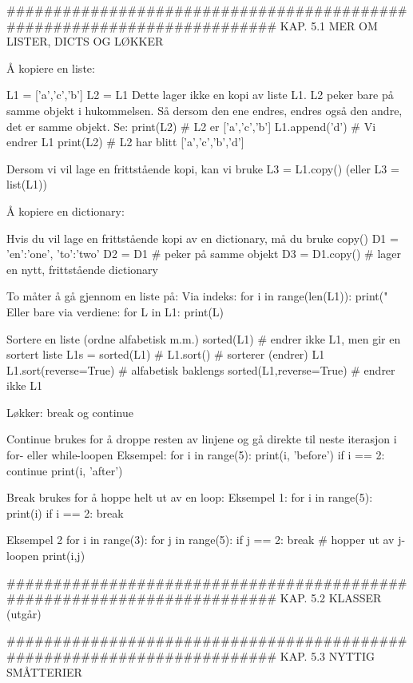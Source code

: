 \documentclass[a4paper,11pt,utf8]{book}
\begin{document}
######################################################################## 
KAP. 5.1  MER OM LISTER, DICTS OG LØKKER

Å kopiere en liste:

L1 = ['a','c','b']
L2 = L1
Dette lager ikke en kopi av liste L1.
L2 peker bare på samme objekt i hukommelsen.
Så dersom den ene endres, endres også den andre, det er samme objekt.
Se: 
print(L2)       # L2 er ['a','c','b']
L1.append('d')  # Vi endrer L1
print(L2)       # L2 har blitt ['a','c','b','d']

Dersom vi vil lage en frittstående kopi, kan vi bruke 
L3 = L1.copy()
(eller L3 = list(L1))



Å kopiere en dictionary: 

Hvis du vil lage en frittstående kopi av en dictionary, må du bruke copy()
D1 = {'en':'one', 'to':'two'}
D2 = D1           # peker på samme objekt
D3 = D1.copy()    # lager en nytt, frittstående dictionary



To måter å gå gjennom en liste på: 
Via indeks: 
for i in range(len(L1)):
    print("%
Eller bare via verdiene: 
for L in L1:
    print(L) 


Sortere en liste (ordne alfabetisk m.m.)
sorted(L1)               # endrer ikke L1, men gir en sortert liste 
L1s = sorted(L1)         # 
L1.sort()                # sorterer (endrer) L1
L1.sort(reverse=True)    # alfabetisk baklengs
sorted(L1,reverse=True)  # endrer ikke L1



Løkker: break og continue 

Continue brukes for å droppe resten av linjene og gå direkte til neste 
iterasjon i for- eller while-loopen
Eksempel: 
for i in range(5): 
    print(i, 'before')
    if i == 2: continue
    print(i, 'after')

Break brukes for å hoppe helt ut av en loop: 
Eksempel 1: 
for i in range(5): 
    print(i)
    if i == 2: break

Eksempel 2
for i in range(3): 
    for j in range(5): 
         if j == 2: break  # hopper ut av j-loopen
         print(i,j)




######################################################################## 
KAP. 5.2  KLASSER  (utgår)



######################################################################## 
KAP. 5.3  NYTTIG SMÅTTERIER
\end{document}

